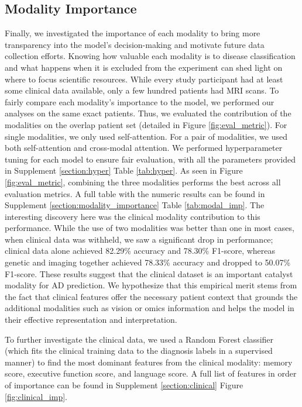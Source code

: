 \documentclass[11pt]{article}
\begin{document}
\subsection*{Modality Importance}
\label{subsection:eval_imp}
Finally, we investigated the importance of each modality to bring more transparency into the model’s decision-making and motivate future data collection efforts. Knowing how valuable each modality is to disease classification and what happens when it is excluded from the experiment can shed light on where to focus scientific resources. While every study participant had at least some clinical data available, only a few hundred patients had MRI scans. To fairly compare each modality's importance to the model, we performed our analyses on the same exact patients. Thus, we evaluated the contribution of the modalities on the overlap patient set (detailed in Figure \ref{fig:eval_metric}). For single modalities, we only used self-attention. For a pair of modalities, we used both self-attention and cross-modal attention. We performed hyperparameter tuning for each model to ensure fair evaluation, with all the parameters provided in Supplement \ref{section:hyper} Table \ref{tab:hyper}. 
As seen in Figure \ref{fig:eval_metric}, combining the three modalities performs the best across all evaluation metrics. A full table with the numeric results can be found in Supplement \ref{section:modality_importance} Table \ref{tab:modal_imp}. The interesting discovery here was the clinical modality contribution to this performance. While the use of two modalities was better than one in most cases, when clinical data was withheld, we saw a significant drop in performance; clinical data alone achieved 82.29\% accuracy and 78.30\% F1-score, whereas genetic and imaging together achieved 78.33\% accuracy and dropped to 50.07\% F1-score. These results suggest that the clinical dataset is an important catalyst modality for AD prediction. We hypothesize that this empirical merit stems from the fact that clinical features offer the necessary patient context that grounds the additional modalities such as vision or omics information and helps the model in their effective representation and interpretation.

To further investigate the clinical data, we used a Random Forest classifier (which fits the clinical training data to the diagnosis labels in a supervised manner) to find the most dominant features from the clinical modality: memory score, executive function score, and language score. A full list of features in order of importance can be found in Supplement \ref{section:clinical} Figure \ref{fig:clinical_imp}. 
\end{document}

